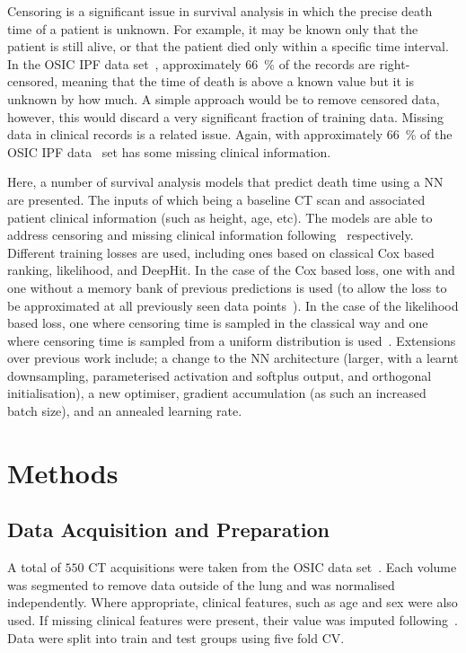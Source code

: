         Censoring is a significant issue in survival analysis in which the precise death time of a patient is unknown. For example, it may be known only that the patient is still alive, or that the patient died only within a specific time interval. In the \gls{OSIC} \gls{IPF} data set~\parencite{OSICOSICRepository}, approximately \SI{66}{\percent} of the records are right-censored, meaning that the time of death is above a known value but it is unknown by how much. A simple approach would be to remove censored data, however, this would discard a very significant fraction of training data. Missing data in clinical records is a related issue. Again, with approximately \SI{66}{\percent} of the \gls{OSIC} \gls{IPF} data~\parencite{OSICOSICRepository} set has some missing clinical information.
    
        Here, a number of survival analysis models that predict death time using a \gls{NN} are presented. The inputs of which being a baseline \gls{CT} scan and associated patient clinical information (such as height, age, etc). The models are able to address censoring and missing clinical information following~\parencite{Shahin2023DeepAnalysis, Shahin2022SurvivalData} respectively. Different training losses are used, including ones based on classical Cox based ranking, likelihood, and DeepHit. In the case of the Cox based loss, one with and one without a memory bank of previous predictions is used (to allow the loss to be approximated at all previously seen data points~\parencite{Shahin2022SurvivalData}). In the case of the likelihood based loss, one where censoring time is sampled in the classical way and one where censoring time is sampled from a uniform distribution is used~\parencite{Shahin2023DeepAnalysis}. Extensions over previous work include; a change to the \gls{NN} architecture (larger, with a learnt downsampling, parameterised activation and softplus output, and orthogonal initialisation), a new optimiser, gradient accumulation (as such an increased batch size), and an annealed learning rate.
    \section{Methods}\label{sec:deep_learning_for_ct_based_survival_analysis_of_idiopathic_pulmonary_fibrosis_patients_appendix_methods}
        \subsection{Data Acquisition and Preparation} \label{sec:deep_learning_for_ct_based_survival_analysis_of_idiopathic_pulmonary_fibrosis_patients_appendix_data_acquisition_and_preparation}
            A total of $550$ \gls{CT} acquisitions were taken from the \gls{OSIC} data set~\parencite{OSICOSICRepository}. Each volume was segmented to remove data outside of the lung and was normalised independently. Where appropriate, clinical features, such as age and sex were also used. If missing clinical features were present, their value was imputed following~\parencite{Shahin2022SurvivalData}. Data were split into train and test groups using five fold \gls{CV}.

